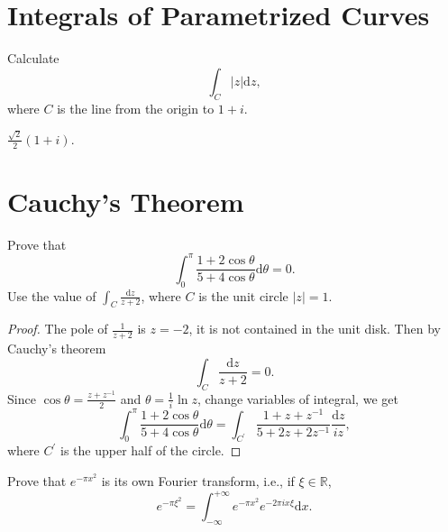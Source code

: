 
\section{Integrals of Parametrized Curves}

\begin{exercise}{}{}
  Calculate
  \begin{equation}
    \int_C |z| \mathrm{d} z,
  \end{equation}
  where $C$ is the line from the origin to $1 + i$.
\end{exercise}

\begin{solution}
  $\frac{\sqrt{2}}{2}(1+i)$.
\end{solution}


\section{Cauchy's Theorem}

\begin{exercise}{}{}
  Prove that
  \begin{equation}
    \int_0^{\pi} \frac{1 + 2 \cos \theta}{5 + 4 \cos \theta} \mathrm{d} \theta = 0.
  \end{equation}
  Use the value of $\int_C \frac{\mathrm{d} z}{z + 2}$, where $C$ is the unit circle $|z| = 1$.
\end{exercise}

\begin{proof}
  The pole of $\frac{1}{z+2}$ is $z = -2$, it is not contained in the unit disk.
  Then by Cauchy's theorem
  \begin{equation}
    \int_C \frac{\mathrm{d} z}{z + 2} = 0.
  \end{equation}
  Since $\cos \theta = \frac{z + z^{-1}}{2}$ and $\theta = \frac{1}{i}\ln z$,
  change variables of integral, we get
  \begin{equation}
    \int_0^{\pi} \frac{1 + 2 \cos \theta}{5 + 4 \cos \theta}\mathrm{d} \theta
    = \int_{C^{\prime}} \frac{1 + z + z^{-1}}{5 + 2z + 2z^{-1}} \frac{\mathrm{d} z}{i z},
  \end{equation}
  where $C^{\prime}$ is the upper half of the circle.
\end{proof}

\begin{exercise}{}{}
  Prove that $e^{-\pi x^2}$ is its own Fourier transform, i.e., if $\xi \in \mathbb{R}$,
  \begin{equation}
    e^{- \pi \xi^2} = \int_{-\infty}^{+\infty} e^{-\pi x^2} e^{-2\pi i x \xi} \mathrm{d} x.
  \end{equation}
\end{exercise}

